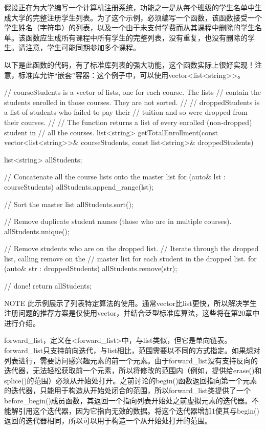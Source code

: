 
假设正在为大学编写一个计算机注册系统，功能之一是从每个班级的学生名单中生成大学的完整注册学生列表。为了这个示例，必须编写一个函数，该函数接受一个学生姓名（字符串）的列表，以及一个由于未支付学费而从其课程中删除的学生名单。该函数应生成所有课程中所有学生的完整列表，没有重复，也没有删除的学生。请注意，学生可能同期参加多个课程。

以下是此函数的代码，有了标准库列表的强大功能，这个函数实际上很好实现！注意，标准库允许“嵌套”容器：这个例子中，可以使用vector<list<string>{}>。

\begin{cpp}
// courseStudents is a vector of lists, one for each course. The lists
// contain the students enrolled in those courses. They are not sorted.
//
// droppedStudents is a list of students who failed to pay their
// tuition and so were dropped from their courses.
//
// The function returns a list of every enrolled (non-dropped) student in
// all the courses.
list<string> getTotalEnrollment(const vector<list<string>>& courseStudents,
                                const list<string>& droppedStudents)
{
    list<string> allStudents;

    // Concatenate all the course lists onto the master list
    for (auto& lst : courseStudents) {
        allStudents.append_range(lst);
    }

    // Sort the master list
    allStudents.sort();

    // Remove duplicate student names (those who are in multiple courses).
    allStudents.unique();

    // Remove students who are on the dropped list.
    // Iterate through the dropped list, calling remove on the
    // master list for each student in the dropped list.
    for (auto& str : droppedStudents) {
        allStudents.remove(str);
    }

    // done!
    return allStudents;
}
\end{cpp}

\begin{myNotic}{NOTE}
此示例展示了列表特定算法的使用。通常vector比list更快，所以解决学生注册问题的推荐方案是仅使用vector，并结合泛型标准库算法，这些将在第20章中进行介绍。
\end{myNotic}


forward\_list，定义在<forward\_list>中，与list类似，但它是单向链表。forward\_list只支持前向迭代，与list相比，范围需要以不同的方式指定。如果想对列表进行，需要访问感兴趣元素的前一个元素。由于forward\_list没有支持反向的迭代器，无法轻松获取前一个元素，所以将修改的范围内（例如，提供给erase()和splice()的范围）必须从开始处打开。之前讨论的begin()函数返回指向第一个元素的迭代器，只能用于构造从开始处闭合的范围，所以forward\_list类提供了一个before\_begin()成员函数，其返回一个指向列表开始处之前虚拟元素的迭代器。不能解引用这个迭代器，因为它指向无效的数据。将这个迭代器增加1使其与begin()返回的迭代器相同，所以可以用于构造一个从开始处打开的范围。

